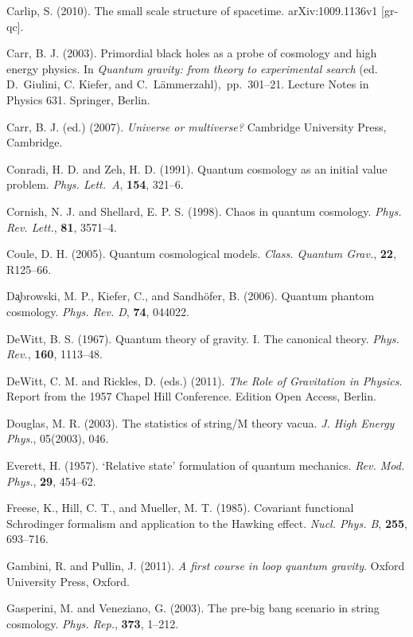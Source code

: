\documentclass[12pt,a4paper]{article}
\begin{document}
\bibitem{} Carlip, S. (2010). The small scale structure of
           spacetime. arXiv:1009.1136v1 [gr-qc].

\bibitem{} Carr, B. J. (2003). Primordial black holes as a probe
           of cosmology and high energy physics. In {\em Quantum 
           gravity: from theory to experimental search} (ed. D.~Giulini,
           C. Kiefer, and C.~L\"ammerzahl),~pp.~301--21. 
           Lecture Notes in Physics 631. Springer, Berlin.

\bibitem{} Carr, B. J. (ed.) (2007). {\em Universe or multiverse?}
           Cambridge University Press, Cambridge. 

\bibitem{} Conradi, H. D. and Zeh, H. D. (1991). Quantum cosmology as an
           initial value problem. {\em Phys. Lett.~A}, {\bf 154},
           321--6.

\bibitem{} Cornish, N. J. and Shellard, E. P. S. (1998).
           Chaos in quantum cosmology. {\em Phys. Rev. Lett.}, {\bf
             81}, 3571--4.

\bibitem{} Coule, D. H. (2005). Quantum cosmological models.
           {\em Class. Quantum Grav.}, {\bf 22}, R125--66. 

\bibitem{} D\c{a}browski, M. P., Kiefer, C., and Sandh\"ofer,
  B. (2006). Quantum phantom cosmology. {\em Phys. Rev. D}, {\bf 74},
  044022.

\bibitem{} DeWitt, B. S. (1967). Quantum theory of gravity. I.
           The canonical theory. {\em Phys. Rev.}, {\bf 160},
           1113--48.

\bibitem{} DeWitt, C. M. and Rickles, D. (eds.) (2011). {\em The Role
    of Gravitation in Physics}. Report from the 1957 Chapel Hill
  Conference. Edition Open Access, Berlin. 

\bibitem{} Douglas, M. R. (2003). The statistics of string/M theory vacua.
           {\em J. High Energy Phys.}, 05(2003), 046.

\bibitem{} Everett, H. (1957). `Relative state' formulation of
           quantum mechanics. {\em Rev. Mod. Phys.}, {\bf 29},
           454--62.

\bibitem{} Freese, K., Hill, C. T., and Mueller, M. T. (1985).       	
Covariant functional Schrodinger formalism and application to the
Hawking effect. {\em Nucl. Phys. B}, {\bf 255}, 693--716.  

\bibitem{} Gambini, R. and Pullin, J. (2011).
           {\em A first course in loop quantum gravity}.
           Oxford University Press, Oxford.

\bibitem{} Gasperini, M. and Veneziano, G. (2003). The pre-big bang
           scenario in string cosmology. {\em Phys. Rep.}, {\bf 373},
           1--212.
\end{document}
